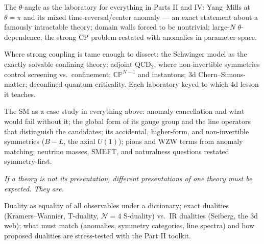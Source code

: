 The $\theta$-angle as the laboratory for everything in Parts II and IV: Yang--Mills at $\theta=\pi$ and its mixed time-reversal/center anomaly --- an exact statement about a famously intractable theory; domain walls forced to be nontrivial; large-$N$ $\theta$-dependence; the strong CP problem restated with anomalies in parameter space.

Where strong coupling is tame enough to dissect: the Schwinger model as the exactly solvable confining theory; adjoint QCD$_2$, where non-invertible symmetries control screening vs.\ confinement; $\mathbb{CP}^{N-1}$ and instantons; 3d Chern--Simons-matter; deconfined quantum criticality. Each laboratory keyed to which 4d lesson it teaches.

The SM as a case study in everything above: anomaly cancellation and what would fail without it; the global form of its gauge group and the line operators that distinguish the candidates; its accidental, higher-form, and non-invertible symmetries ($B-L$, the axial $U(1)$); pions and WZW terms from anomaly matching; neutrino masses, SMEFT, and naturalness questions restated symmetry-first.


\noin \emph{If a theory is not its presentation, different presentations of one theory must be expected. They are.}

Duality as equality of all observables under a dictionary; exact dualities (Kramers--Wannier, T-duality, $\mathcal{N}=4$ S-duality) vs.\ IR dualities (Seiberg, the 3d web); what must match (anomalies, symmetry categories, line spectra) and how proposed dualities are stress-tested with the Part II toolkit.

